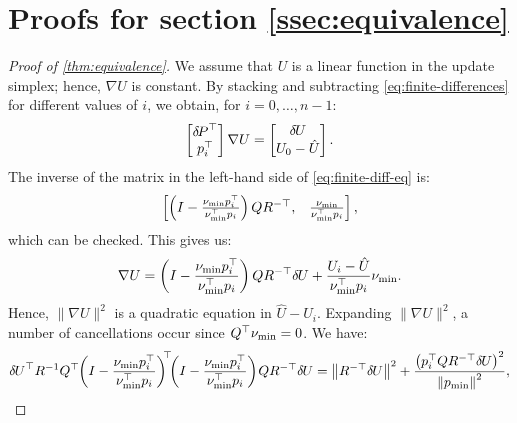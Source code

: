 \documentclass[sisc-eikonal.tex]{subfiles}
\begin{document}
\section{Proofs for section
  \ref{ssec:equivalence}}\label{sec:equivalence-proofs}

\begin{proof}[Proof of \cref{thm:equivalence}]
  We assume that $U$ is a linear function in the update simplex;
  hence, $\nabla U$ is constant. By stacking and subtracting
  \cref{eq:finite-differences} for different values of $i$, we obtain,
  for $i = 0, \hdots, n - 1$:
  \begin{equation}\label{eq:finite-diff-eq}
    \begin{bmatrix}
      \delP^\top \\
      p_i^\top
    \end{bmatrix} \nabla U = \begin{bmatrix}
      \delU \\
      U_0 - \hat{U}
    \end{bmatrix}.
  \end{equation}
  The inverse of the matrix in the left-hand side of \cref{eq:finite-diff-eq} is:
  \begin{equation}
    \begin{bmatrix}
      \left(I - \frac{\nu_{\operatorname{min}} p_i^\top}{\nu_{\operatorname{min}}^\top p_i}\right) Q R^{-\top}, &
      \frac{\nu_{\operatorname{min}}}{\nu_{\operatorname{min}}^\top p_i}
    \end{bmatrix},
  \end{equation}
  which can be checked. This gives us:
  \begin{equation}
    \nabla U = \left(I - \frac{\nu_{\operatorname{min}} p_i^\top}{\nu_{\operatorname{min}}^\top p_i}\right) Q R^{-\top} {\delta \hspace{-0.09em} U} + \frac{U_i - \hat{U}}{\nu_{\operatorname{min}}^\top p_i} \nu_{\operatorname{min}}.
  \end{equation}
  Hence, $\|\nabla U\|^2$ is a quadratic equation in
  $\hat{U} - U_i$. Expanding $\|\nabla U\|^2$, a number of
  cancellations occur since $Q^\top \nu_{\operatorname{min}} = 0$. We have:
  \begin{equation}
    {\delta \hspace{-0.09em} U}^\top R^{-1} Q^\top \hspace{-0.25em} \left(I - \frac{\nu_{\operatorname{min}} p_i^\top}{\nu_{\operatorname{min}}^\top p_i}\right)^{\hspace{-0.25em}\top} \hspace{-0.4em} \left(I - \frac{\nu_{\operatorname{min}} p_i^\top}{\nu_{\operatorname{min}}^\top p_i}\right) \hspace{-0.1em} Q R^{-\top} {\delta \hspace{-0.09em} U} = \left\|R^{-\top} {\delta \hspace{-0.09em} U}\right\|^2 + \frac{\left(p_i^\top Q R^{-\top} {\delta \hspace{-0.09em} U}\right)^2}{\left\|p_{\operatorname{min}}\right\|^2},
  \end{equation}

\end{proof}
\end{document}
